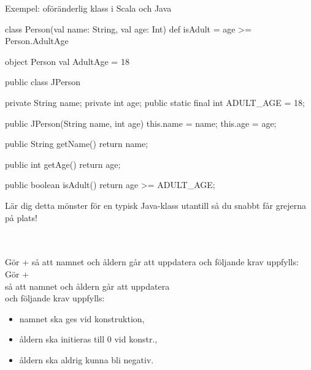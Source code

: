 \begin{Slide}{Exempel: oföränderlig klass i Scala och Java}
\ifkompendium
\noindent{}
\else
\SlideFontTiny\vspace{-1em}\begin{multicols}{2}
\fi
\begin{CodeSmall}[basicstyle=\ttfamily\SlideFontSize{5.7}{6.7}]
class Person(val name: String, val age: Int){
  def isAdult = age >= Person.AdultAge
}

object Person {
  val AdultAge = 18
}
\end{CodeSmall}

\ifkompendium
\noindent{}
\else
\columnbreak
\fi

\pause
\begin{CodeSmall}[language=Java,basicstyle=\ttfamily\SlideFontSize{5.7}{6.7}]
public class JPerson {
    private String name;
    private int age;
    public static final int ADULT_AGE = 18;

    public JPerson(String name, int age) {
      this.name = name;
      this.age = age;
    }

    public String getName() {
        return name;
    }

    public int getAge() {
        return age;
    }

    public boolean isAdult() {
        return age >= ADULT_AGE;
    }
}
\end{CodeSmall}
Lär dig detta mönster för en typisk Java-klass utantill så du snabbt får grejerna på plats!
\ifkompendium\\\else
\end{multicols}
\pause\vspace{-13em}%
\fi%
~\\\\
\ifkompendium
Gör  +   så att namnet och åldern går att uppdatera och följande krav uppfylls:
\else
Gör  +  \\så att namnet och åldern går att uppdatera\\och följande krav uppfylls:
\fi
\begin{itemize}
\item namnet ska ges vid konstruktion,
\item åldern ska initieras till 0 vid konstr.,
\item åldern ska aldrig kunna bli negativ.
\end{itemize}
\end{Slide}


